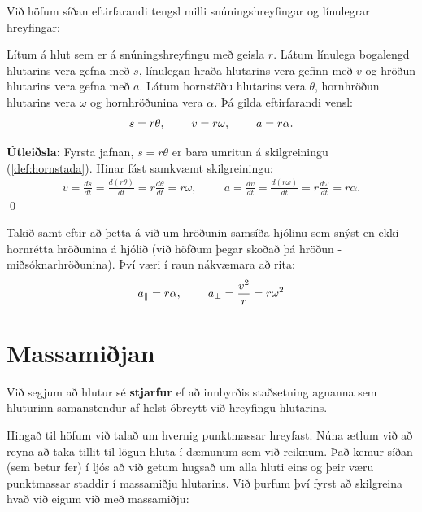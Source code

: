 \ifdefined \wholebook \else\documentclass[oneside]{book}\usepackage{EdlBook}\graphicspath{{figures/}}
\begin{document}
Við höfum síðan eftirfarandi tengsl milli snúningshreyfingar og línulegrar hreyfingar:

\begin{tcolorbox}
\begin{theorem}
Lítum á hlut sem er á snúningshreyfingu með geisla $r$. Látum línulega bogalengd hlutarins vera gefna með $s$, línulegan hraða hlutarins vera gefinn með $v$ og hröðun hlutarins vera gefna með $a$. Látum hornstöðu hlutarins vera $\theta$, hornhröðun hlutarins vera $\omega$ og hornhröðunina vera $\alpha$. Þá gilda eftirfarandi vensl:
\begin{align*}
    s = r\theta, \hspace{0.8cm} v = r\omega, \hspace{0.8cm} a = r\alpha.
\end{align*}
\end{theorem}
\end{tcolorbox}
\textbf{Útleiðsla:} Fyrsta jafnan, $s = r\theta$ er bara umritun á skilgreiningu (\ref{def:hornstada}). Hinar fást samkvæmt skilgreiningu: 
\begin{align*}
    v = \frac{ds}{dt} = \frac{d(r\theta)}{dt} = r \frac{d\theta}{dt} = r\omega, \hspace{1cm} a = \frac{dv}{dt} = \frac{d(r\omega)}{dt} = r \frac{d\omega}{dt} = r\alpha.
\end{align*}
\qed

Takið samt eftir að þetta á við um hröðunin samsíða hjólinu sem snýst en ekki hornrétta hröðunina á hjólið (við höfðum þegar skoðað þá hröðun - miðsóknarhröðunina). Því væri í raun nákvæmara að rita:
\begin{align*}
    a_{\parallel} = r\alpha, \hspace{0.8cm} a_{\perp} = \frac{v^2}{r} = r\omega^2
\end{align*}

\section{Massamiðjan}


\begin{tcolorbox}
\begin{definition}
Við segjum að hlutur sé \textbf{stjarfur} ef að innbyrðis staðsetning agnanna sem hluturinn samanstendur af helst óbreytt við hreyfingu hlutarins.
\end{definition}
\end{tcolorbox}

Hingað til höfum við talað um hvernig punktmassar hreyfast. Núna ætlum við að reyna að taka tillit til lögun hluta í dæmunum sem við reiknum. Það kemur síðan (sem betur fer) í ljós að við getum hugsað um alla hluti eins og þeir væru punktmassar staddir í massamiðju hlutarins. Við þurfum því fyrst að skilgreina hvað við eigum við með massamiðju:
\end{document}

